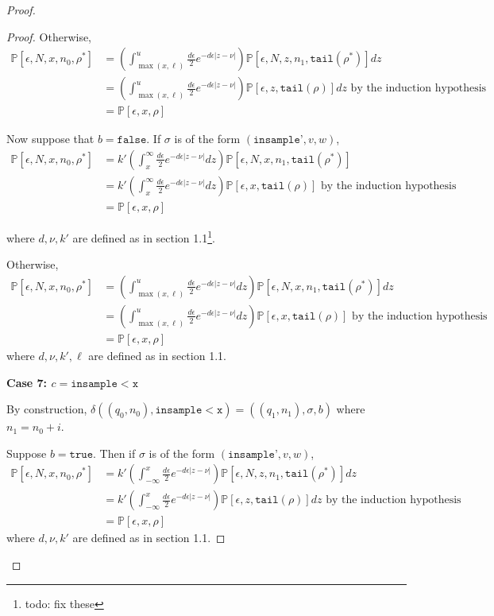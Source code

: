 \documentclass[12pt]{article}
\newcommand{\PP}{\mathbb{P}}
\newcommand{\lguard}{\texttt{insample} < \texttt{x}}
\theoremstyle{definition}
\begin{document}
\begin{proof}
\begin{proof}
	Otherwise, 
	\begin{align*}
		\PP[\epsilon, N, x, n_0, \rho^*] &= \left(\int_{\max(x, \ell)}^u\frac{d\epsilon}{2}e^{-d\epsilon|z-\nu|}\right)\PP[\epsilon, N, z, n_1, \texttt{tail}(\rho^*)]dz \\
		&= \left(\int_{\max(x, \ell)}^u\frac{d\epsilon}{2}e^{-d\epsilon|z-\nu|}\right)\PP[\epsilon, z, \texttt{tail}(\rho)]dz \text{ by the induction hypothesis }\\
		&= \PP[\epsilon, x, \rho]
	\end{align*}

	Now suppose that $b = \texttt{false}$. If $\sigma$ is of the form $(\texttt{insample'}, v, w)$, 
	\begin{align*}
		\PP[\epsilon, N, x, n_0, \rho^*] &= k'\left(\int_x^\infty\frac{d\epsilon}{2}e^{-d\epsilon|z-\nu|}dz\right)\PP[\epsilon, N, x, n_1, \texttt{tail}(\rho^*)]\\
		&= k'\left(\int_x^\infty\frac{d\epsilon}{2}e^{-d\epsilon|z-\nu|}dz\right)\PP[\epsilon, x, \texttt{tail}(\rho)] \text{ by the induction hypothesis }\\
		&= \PP[\epsilon, x, \rho]
	\end{align*}

	where $d, \nu, k'$ are defined as in section 1.1\footnote{todo: fix these}.

	Otherwise, 
	\begin{align*}
		\PP[\epsilon, N, x, n_0, \rho^*] &= \left(\int_{\max(x, \ell)}^u\frac{d\epsilon}{2}e^{-d\epsilon|z-\nu|}dz\right)\PP[\epsilon, N, x, n_1, \texttt{tail}(\rho^*)]dz \\
		&= \left(\int_{\max(x, \ell)}^u\frac{d\epsilon}{2}e^{-d\epsilon|z-\nu|}dz\right)\PP[\epsilon, x, \texttt{tail}(\rho)] \text{ by the induction hypothesis }\\
		&= \PP[\epsilon, x, \rho]
	\end{align*}
	where $d, \nu, k', \ell$ are defined as in section 1.1.

	\textbf{Case 7: $c = \lguard$}

	By construction, $\delta((q_0, n_0), \lguard) = ((q_1, n_1), \sigma, b)$ where $n_1 = n_0+i$. 

	Suppose $b = \texttt{true}$. Then if $\sigma$ is of the form $(\texttt{insample'}, v, w)$, 
		\begin{align*}
			\PP[\epsilon, N, x, n_0, \rho^*] &= k'\left(\int_{-\infty}^x\frac{d\epsilon}{2}e^{-d\epsilon|z-\nu|}\right)\PP[\epsilon, N, z, n_1, \texttt{tail}(\rho^*)]dz \\
			&= k'\left(\int_{-\infty}^x\frac{d\epsilon}{2}e^{-d\epsilon|z-\nu|}\right)\PP[\epsilon, z, \texttt{tail}(\rho)]dz \text{ by the induction hypothesis }\\
			&= \PP[\epsilon, x, \rho]
		\end{align*}
	where $d, \nu, k'$ are defined as in section 1.1.
	

\end{proof}
\end{proof}
\end{document}

